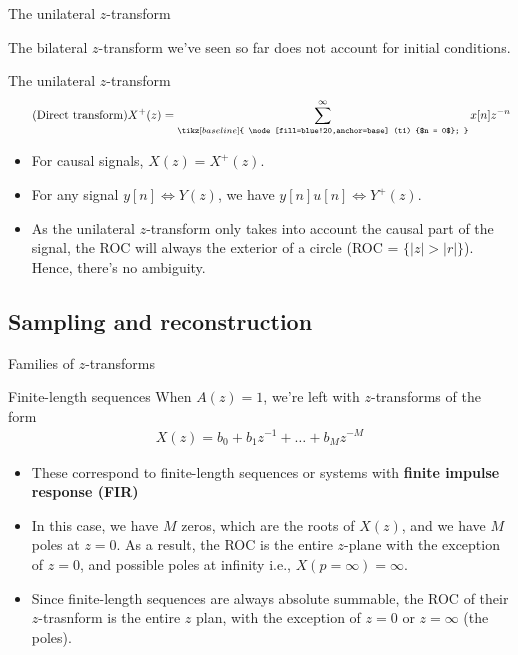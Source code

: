 %
\begin{frame}{The unilateral $z$-transform}

The bilateral $z$-transform we've seen so far does not account for initial conditions.

\begin{block}{The unilateral $z$-transform}
	\begin{equation*} \tag{Direct transform}
	X^+(z) = \sum_{\tikz[baseline]{
			\node[fill=blue!20,anchor=base] (t1) {$n = 0$};
	}}^{\infty} x[n]z^{-n} 
	\end{equation*}
\end{block}

\begin{itemize}
	\item For causal signals, $X(z) = X^+(z)$. \\
	\item For any signal $y[n] \Longleftrightarrow Y(z)$, we have $y[n]u[n] \Longleftrightarrow Y^+(z)$. \\
	\item As the unilateral $z$-transform only takes into account the causal part of the signal, the ROC will always the exterior of a circle (ROC = $\{|z|>|r|\}$). Hence, there's no ambiguity.
\end{itemize}

\end{frame}

\subsection{Sampling and reconstruction}
%
\begin{frame}{Families of $z$-transforms}	
\begin{block}{Finite-length sequences}
	When $A(z) = 1$, we're left with $z$-transforms of the form
	\begin{align*}
	X(z) = b_0 + b_1z^{-1}+\ldots+b_Mz^{-M}
	\end{align*}
	\begin{itemize}
		\item These correspond to finite-length sequences or systems with \textbf{finite impulse response (FIR)}
		\item In this case, we have $M$ zeros, which are the roots of $X(z)$, and we have $M$ poles at $z = 0$. As a result, the ROC is the entire $z$-plane with the exception of $z = 0$, and possible poles at infinity i.e., $X(p = \infty) = \infty$.
		\item Since finite-length sequences are always absolute summable, the ROC of their $z$-trasnform is the entire $z$ plan, with the exception of $z = 0$ or $z = \infty$ (the poles).
	\end{itemize}	
\end{block}

\end{frame}

